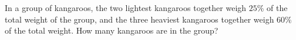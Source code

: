 In a group of kangaroos, the two lightest kangaroos together weigh $25\%$ of the total weight of the group, and the three heaviest kangaroos together weigh $60\%$ of the total weight. How many kangaroos are in the group?
